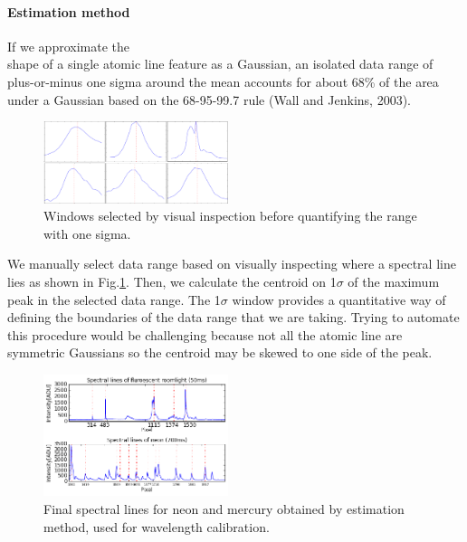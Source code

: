 \documentclass[authoryear,12pt,5p,times]{elsarticle}
\newcommand{\rpm}{\raisebox{.2ex}{$\scriptstyle\pm$}}
\begin{document}
\paragraph*{\textbf{Estimation method}} 
If we approximate the \\ shape of a single atomic line feature as a Gaussian, an isolated data range of plus-or-minus one sigma around the mean accounts for about 68\% of the area under a Gaussian based on the 68-95-99.7 rule (Wall and Jenkins, 2003).
\begin{figure}
\includegraphics[width=0.48\textwidth]{figures/window}
\caption{Windows selected by visual inspection before quantifying the range with one sigma.}\label{window}
\end{figure}
We manually select data range based on visually inspecting where a spectral line lies as shown in Fig.\ref{window}. Then, we calculate the centroid on \large\rpm \normalsize 1$\sigma$ of the maximum peak in the selected data range. The 1$\sigma$ window provides a quantitative way of defining the boundaries of the data range that we are taking. Trying to automate this procedure would be challenging because not all the atomic line are symmetric Gaussians so the centroid may be skewed to one side of the peak. 
\label{estimate-sec}
\begin{figure}
\includegraphics[width=0.48\textwidth]{figures/spectral_lines}
\caption{Final spectral lines for neon and mercury obtained by estimation method, used for wavelength calibration.}\label{final_lines}
\end{figure}
\end{document}
